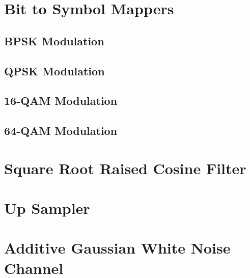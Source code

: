 \documentclass[]{article}
\begin{document}
\section{Bit to Symbol Mappers}
\label{app:bittosym}
\subsection{BPSK Modulation }
\label{app:bpsk_mod}
%



\subsection{QPSK Modulation}
\label{app:qpsk_mod}


\subsection{16-QAM Modulation}
\label{app:qam_16_mod}



\subsection{64-QAM Modulation }
\label{app:qam_64_mod}


\newpage
\section{Square Root Raised Cosine Filter}
\label{app:sqrt_raised_cosine}



\section{Up Sampler}
\label{app:impulse_train}


\section{Additive Gaussian White Noise Channel}
\label{app:awgn_channel}

\end{document}
